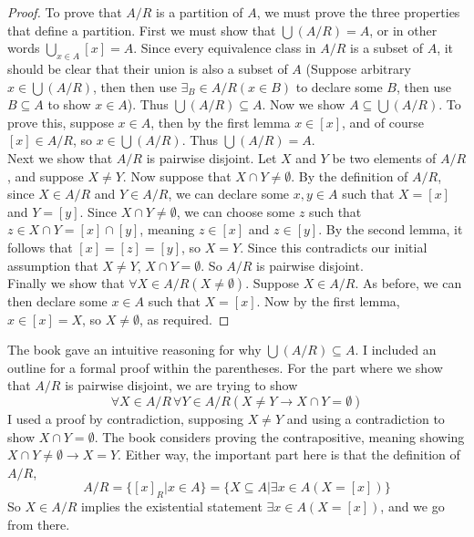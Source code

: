 \documentclass{report}
\theoremstyle{definition}
\begin{document}
\begin{proof}
To prove that $A/R$ is a partition of $A$, we must prove the three properties that define a partition. First we must show that $\bigcup(A/R)=A$, or in other words 
$\bigcup_{x\in A}[x]=A$. Since every equivalence class in $A/R$ is a subset of $A$, it should be clear that their union is also a subset of $A$ (Suppose arbitrary $x\in\bigcup(A/R)$, then then use 
$\exists_B\in A/R(x\in B)$ to declare some $B$, then use $B\subseteq A$ to show $x\in A$). Thus 
$\bigcup(A/R)\subseteq A$. Now we show $A\subseteq\bigcup(A/R)$. To prove this, suppose $x\in A$, then by the first lemma $x\in[x]$, and of course $[x]\in A/R$, so $x\in\bigcup(A/R)$. Thus $\bigcup(A/R)=A$.\\
\indent Next we show that $A/R$ is pairwise disjoint. Let $X$ and $Y$ be two elements of $A/R$, and suppose $X\neq Y$. Now suppose that $X\cap Y\neq\emptyset$. By the definition of $A/R$, since 
$X\in A/R$ and $Y\in A/R$, we can
declare some $x,y\in A$ such that $X=[x]$ and $Y=[y]$. Since $X\cap Y\neq\emptyset$, we can choose some $z$ such that $z\in X\cap Y=[x]\cap[y]$, meaning $z\in[x]$ and $z\in[y]$. By the second
lemma, it follows that $[x]=[z]=[y]$, so $X=Y$. Since this contradicts our initial assumption that
$X\neq Y$, $X\cap Y=\emptyset$. So $A/R$ is pairwise disjoint.\\
\indent Finally we show that $\forall X\in A/R(X\neq\emptyset)$. Suppose $X\in A/R$. As before, we can then declare some $x\in A$ such that $X=[x]$. Now by the first lemma, $x\in[x]=X$, so 
$X\neq\emptyset$, as required.
\end{proof}
\noindent The book gave an intuitive reasoning for why $\bigcup(A/R)\subseteq A$. I included an outline for a formal proof within the parentheses. For the part where we show that $A/R$ is pairwise disjoint,
we are trying to show
\begin{equation*}
\forall X\in A/R\,\forall Y\in A/R(X\neq Y\to X\cap Y=\emptyset)
\end{equation*}
I used a proof by contradiction, supposing $X\neq Y$ and using a contradiction to show $X\cap Y=\emptyset$. The book considers proving the contrapositive, meaning showing 
$X\cap Y\neq\emptyset\to X=Y$. Either way, the important part here is that the definition of $A/R$,
\begin{equation*}
A/R=\{[x]_R|x\in A\}=\{X\subseteq A|\exists x\in A(X=[x])\}
\end{equation*}
So $X\in A/R$ implies the existential statement $\exists x\in A(X=[x])$, and we go from there.
\newpage
\end{document}

